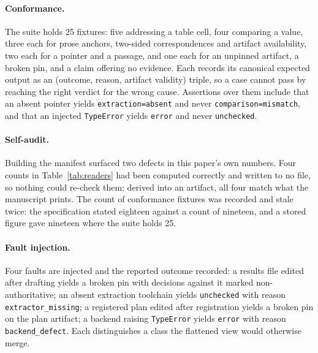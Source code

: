 \documentclass{article}
\newcommand{\code}[1]{\texttt{#1}}
\begin{document}
\paragraph{Conformance.}

The suite holds 25 fixtures: five addressing a table cell, four
comparing a value, three each for prose anchors, two-sided correspondences and artifact
availability, two each for a pointer and a passage, and one each for an unpinned artifact, a
broken pin, and a claim offering no evidence. Each records its canonical expected output as an
(outcome, reason, artifact validity) triple, so a case cannot pass by reaching the right verdict
for the wrong cause. Assertions over them include that an absent pointer yields
\code{extraction=absent} and never \code{comparison=mismatch}, and that an injected
\code{TypeError} yields \code{error} and never \code{unchecked}.

\paragraph{Self-audit.} Building the manifest surfaced two defects in this paper's own numbers. Four counts in
Table~\ref{tab:readers} had been computed correctly and written to no file, so nothing could
re-check them; derived into an artifact, all four match what the manuscript prints. The count of
conformance fixtures was recorded and stale twice: the specification stated eighteen against a
count of nineteen, and a stored figure gave nineteen where the suite holds 25.

\paragraph{Fault injection.}

Four faults are injected and the reported outcome recorded: a results
file edited after drafting yields a broken pin with decisions against it marked non-authoritative;
an absent extraction toolchain yields \code{unchecked} with reason \code{extractor\_missing}; a
registered plan edited after registration yields a broken pin on the plan artifact; a backend
raising \code{TypeError} yields \code{error} with reason \code{backend\_defect}. Each distinguishes
a class the flattened view would otherwise merge.
\end{document}

